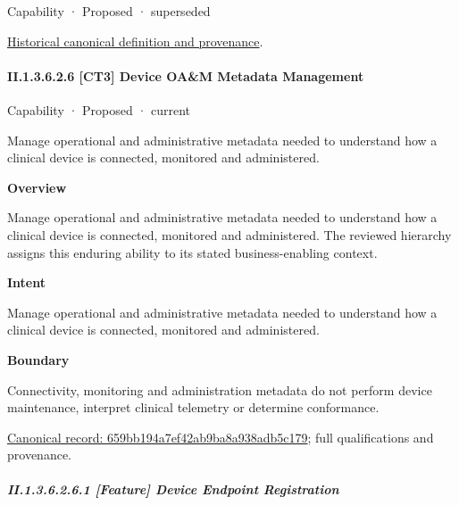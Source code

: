 \label{element:dd860926038f41e082c56e38cbb5ab95}
{\small Capability · Proposed · superseded}\par
\href{../../../../continuum/strategy/capability/dd860926038f41e082c56e38cbb5ab95.md}{Historical canonical definition and provenance}.\par
\paragraph*{II.1.3.6.2.6 [CT3] Device OA\&M Metadata Management}
\label{navigation:II.1.3.6.2.6}

\label{element:659bb194a7ef42ab9ba8a938adb5c179}
{\small Capability · Proposed · current}\par

Manage operational and administrative metadata needed to understand how a clinical device is connected, monitored and administered.



\textbf{Overview}



Manage operational and administrative metadata needed to understand how a clinical device is connected, monitored and administered. The reviewed hierarchy assigns this enduring ability to its stated business-enabling context.



\textbf{Intent}



Manage operational and administrative metadata needed to understand how a clinical device is connected, monitored and administered.



\textbf{Boundary}



Connectivity, monitoring and administration metadata do not perform device maintenance, interpret clinical telemetry or determine conformance.


{\footnotesize \href{../../../../continuum/strategy/capability/659bb194a7ef42ab9ba8a938adb5c179.md}{Canonical record: 659bb194a7ef42ab9ba8a938adb5c179}; full qualifications and provenance.}\par
\subparagraph*{II.1.3.6.2.6.1 [Feature] Device Endpoint Registration}
\label{navigation:II.1.3.6.2.6.1}

